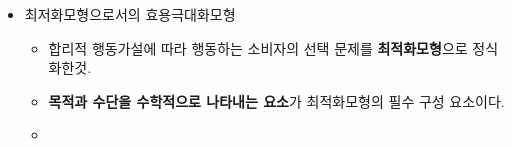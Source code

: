 \documentclass{report}
\begin{document}
\begin{itemize}
\begin{itemize}
\begin{itemize}
\begin{itemize}
\begin{itemize}
                \end{itemize}
            \end{itemize}
        \end{itemize}
        \item 최저화모형으로서의 효용극대화모형
        \begin{itemize}
            \item 합리적 행동가설에 따라 행동하는 소비자의 선택 문제를 \textbf{최적화모형}으로 정식화한것.
            \item \textbf{목적과 수단을 수학적으로 나타내는 요소}가 최적화모형의 필수 구성 요소이다.
            \item 
        \end{itemize}
    \end{itemize}
\end{itemize}
\end{document}
